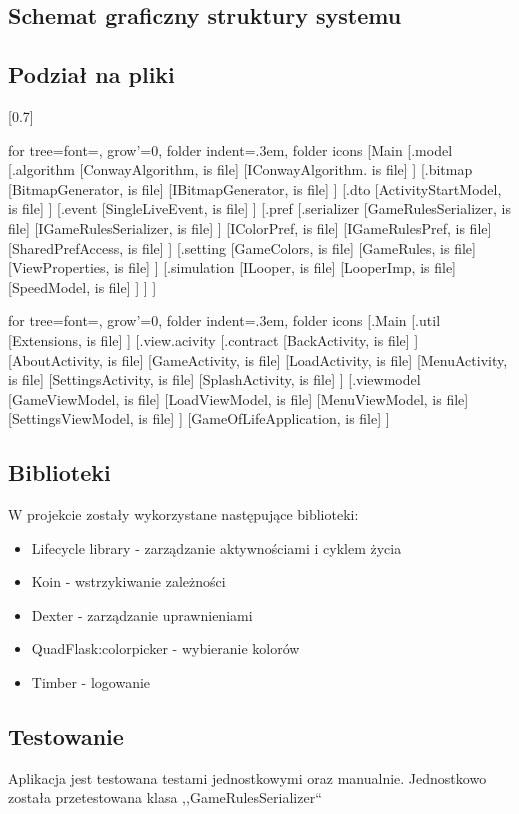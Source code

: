 \documentclass[12pt,a4paper]{article}
\begin{document}
\subsection{Schemat graficzny struktury systemu}
\subsection{Podział na pliki}
\begin{multicols}{2}
\scalebox{0.7}[0.7]{
			\begin{forest}
				for tree={font=\sffamily, grow'=0,
    folder indent=.3em, folder icons}
    	[Main
    	    [.model
				[.algorithm
					[ConwayAlgorithm, is file]
					[IConwayAlgorithm. is file]				
				]
				[.bitmap
					[BitmapGenerator, is file]				
					[IBitmapGenerator, is file]
				]
				[.dto
					[ActivityStartModel, is file]				
				]
				[.event
					[SingleLiveEvent, is file]				
				]
				[.pref
					[.serializer
						[GameRulesSerializer, is file]
						[IGameRulesSerializer, is file]		
					]
					[IColorPref, is file]
					[IGameRulesPref, is file]
					[SharedPrefAccess, is file]
				]
				[.setting
					[GameColors, is file]
					[GameRules, is file]
					[ViewProperties, is file]
				]
				[.simulation
					[ILooper, is file]
					[LooperImp, is file]
					[SpeedModel, is file]
				]    	    
    	    ]
    	 ]
    	 \end{forest}
		\begin{forest}
				for tree={font=\sffamily, grow'=0,
    folder indent=.3em, folder icons}
    [.Main
     		[.util
				[Extensions, is file]    	    
    	    ]
    	    [.view.acivity
    	    	[.contract
					  [BackActivity, is file]  	    	
    	    	]
				[AboutActivity, is file]    	    
				[GameActivity, is file]
				[LoadActivity, is file]
				[MenuActivity, is file]
				[SettingsActivity, is file]
				[SplashActivity, is file]
    	    ]
    	    [.viewmodel
				[GameViewModel, is file]
				[LoadViewModel, is file]
				[MenuViewModel, is file]
				[SettingsViewModel, is file]    	    	
    	    ]
    	    [GameOfLifeApplication, is file]
       	]
			\end{forest}
			}

		\end{multicols}
\subsection{Biblioteki}
W projekcie zostały wykorzystane następujące biblioteki:
\begin{itemize}
\item Lifecycle library - zarządzanie aktywnościami i cyklem życia
\item Koin - wstrzykiwanie zależności
\item Dexter - zarządzanie uprawnieniami
\item QuadFlask:colorpicker - wybieranie kolorów
\item Timber - logowanie
\end{itemize}
\subsection{Testowanie}
Aplikacja jest testowana testami jednostkowymi oraz manualnie. Jednostkowo została przetestowana klasa ,,GameRulesSerializer``
\end{document}

